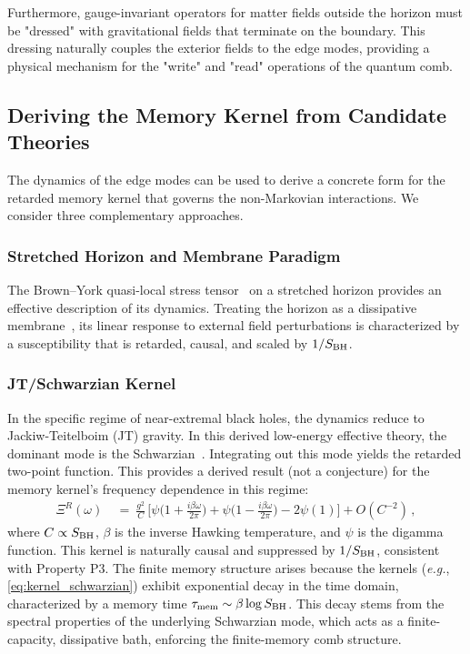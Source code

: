 \documentclass[aps,prd,preprint,onecolumn,superscriptaddress,nofootinbib,longbibliography,floatfix,11pt,showpacs,showkeys]{revtex4-2}
\newcommand{\eg}{\textit{e.g.}\xspace}
\theoremstyle{plain}
\theoremstyle{definition}
\theoremstyle{remark}
\begin{document}
Furthermore, gauge-invariant operators for matter fields outside the horizon must be "dressed" with gravitational fields that terminate on the boundary. This dressing naturally couples the exterior fields to the edge modes, providing a physical mechanism for the "write" and "read" operations of the quantum comb.

\subsection{Deriving the Memory Kernel from Candidate Theories}
\label{sec:derive_qg}
The dynamics of the edge modes can be used to derive a concrete form for the retarded memory kernel that governs the non-Markovian interactions. We consider three complementary approaches.

\subsubsection{Stretched Horizon and Membrane Paradigm} The Brown--York quasi-local stress tensor~\cite{BrownYork:1993, Iyer:1994} on a stretched horizon provides an effective description of its dynamics. Treating the horizon as a dissipative membrane~\cite{Thorne:1986}, its linear response to external field perturbations is characterized by a susceptibility that is retarded, causal, and scaled by $1/S_{\rm BH}$.

\subsubsection{JT/Schwarzian Kernel} In the specific regime of near-extremal black holes, the dynamics reduce to Jackiw-Teitelboim (JT) gravity. In this derived low-energy effective theory, the dominant mode is the Schwarzian~\cite{MSY:2016, Jensen:2016}. Integrating out this mode yields the retarded two-point function. This provides a derived result (not a conjecture) for the memory kernel's frequency dependence in this regime:
\begin{align}
\Xi^R(\omega)\ &=\ \frac{g^2}{C}\,\Big[\psi\!\Big(1+\frac{i \beta \omega}{2\pi}\Big)+\psi\!\Big(1-\frac{i \beta \omega}{2\pi}\Big) - 2\psi(1)\Big] + O(C^{-2})\,,
\label{eq:kernel_schwarzian}
\end{align}
where $C \propto S_{\rm BH}$, $\beta$ is the inverse Hawking temperature, and $\psi$ is the digamma function. This kernel is naturally causal and suppressed by $1/S_{\rm BH}$, consistent with Property P3.
The finite memory structure arises because the kernels (\eg, \eqref{eq:kernel_schwarzian}) exhibit exponential decay in the time domain, characterized by a memory time $\tau_{\rm mem} \sim \beta \log S_{\rm BH}$. This decay stems from the spectral properties of the underlying Schwarzian mode, which acts as a finite-capacity, dissipative bath, enforcing the finite-memory comb structure.
\end{document}
